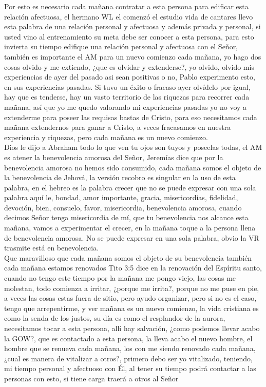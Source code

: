 \documentclass[12pt]{article}
\begin{document}
Por esto es necesario cada mañana contratar a esta persona para edificar esta relación afectuosa, el hermano WL el comenzó el estudio vida de cantares llevo esta palabra de una relación personal y afectuosa y además privada y personal, si usted vino al entrenamiento su meta debe ser conocer a esta persona, para esto invierta su tiempo edifique una relación personal y afectuosa con el Señor, también es importante el AM para un nuevo comienzo cada mañana, yo hago dos cosas olvido y me extiendo, ¿que es olvidar y extenderse?, yo olvido, olvido mis experiencias de ayer del pasado asi sean positivas o no, Pablo experimento esto, en sus experiencias pasadas. Si tuvo un éxito o fracaso ayer olvídelo por igual, hay que es tenderse, hay un vasto territorio de las riquezas para recorrer cada mañana, así que yo me quedo valorando mi experiencias pasadas yo no voy a extenderme para poseer las requisas bastas de Cristo, para eso necesitamos cada mañana extendernos para ganar a Cristo, a veces fracasamos en nuestra experiencia y riquezas, pero cada mañana es un nuevo comienzo.\\


Dios le dijo a Abraham todo lo que ven tu ojos son tuyos y poseelas todas, el AM es atener la benevolencia amorosa del Señor, Jeremías dice que por la benevolencia amorosa no hemos sido consumido, cada mañana somos el objeto de la benevolencia de Jehová, la versión recobro es singular en la uso de esta palabra, en el hebreo es la palabra crecer que no se puede expresar con una sola palabra aquí le, bondad, amor importante, gracia, misericordias, fidelidad, devoción, bien, consuelo, favor, misericordia, benevolencia amorosa, cuando decimos Señor tenga misericordia de mí, que tu benevolencia nos alcance esta mañana, vamos a experimentar el crecer, en la mañana toque a la persona llena de benevolencia amorosa. No se puede expresar en una sola palabra, obvio la VR trasmite está en benevolencia.\\


Que maravilloso que cada mañana somos el objeto de su benevolencia también cada mañana estamos renovados Tito 3:5 dice en la renovación del Espíritu santo, cuando no tengo este tiempo por la mañana me pongo viejo, las cosas me molestan, todo comienza a irritar, ¿porque me irrita?, porque no me puse en pie, a veces las cosas estas fuera de sitio, pero ayudo organizar, pero si no es el caso, tengo que arrepentirme, y  ver mañana es un nuevo comienzo, la vida cristiana es como la senda de los justos, su día es como el resplandor de la aurora, necesitamos tocar a esta persona, allí hay salvación, ¿como podemos llevar acabo la GOW?, que es contactado a esta persona, la lleva acabo el nuevo hombre, el hombre que se renueva cada mañana, los con me siendo renovado cada mañana, ¿cual es manera de vitalizar a otros?, primero debo ser yo vitalizado, teniendo, mi tiempo personal y afectuoso con Él, al tener su tiempo podrá contactar a las personas con esto, si tiene carga traerá a otros al Señor\\
\end{document}
